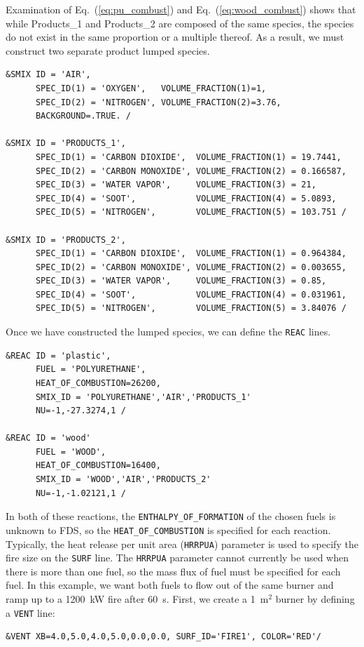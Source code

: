 \documentclass[11pt]{book}
\newcommand{\ct}{\tt\small}
\begin{document}
Examination of Eq.~(\ref{eq:pu_combust}) and Eq.~(\ref{eq:wood_combust}) shows that while Products\_1 and Products\_2 are composed of the same species, the species do not exist in the same proportion or a multiple thereof. As a result, we must construct two separate product lumped species.
\footnotesize \begin{verbatim}
&SMIX ID = 'AIR',
      SPEC_ID(1) = 'OXYGEN',   VOLUME_FRACTION(1)=1,
      SPEC_ID(2) = 'NITROGEN', VOLUME_FRACTION(2)=3.76,
      BACKGROUND=.TRUE. /

&SMIX ID = 'PRODUCTS_1',
      SPEC_ID(1) = 'CARBON DIOXIDE',  VOLUME_FRACTION(1) = 19.7441,
      SPEC_ID(2) = 'CARBON MONOXIDE', VOLUME_FRACTION(2) = 0.166587,
      SPEC_ID(3) = 'WATER VAPOR',     VOLUME_FRACTION(3) = 21,
      SPEC_ID(4) = 'SOOT',            VOLUME_FRACTION(4) = 5.0893,
      SPEC_ID(5) = 'NITROGEN',        VOLUME_FRACTION(5) = 103.751 /

&SMIX ID = 'PRODUCTS_2',
      SPEC_ID(1) = 'CARBON DIOXIDE',  VOLUME_FRACTION(1) = 0.964384,
      SPEC_ID(2) = 'CARBON MONOXIDE', VOLUME_FRACTION(2) = 0.003655,
      SPEC_ID(3) = 'WATER VAPOR',     VOLUME_FRACTION(3) = 0.85,
      SPEC_ID(4) = 'SOOT',            VOLUME_FRACTION(4) = 0.031961,
      SPEC_ID(5) = 'NITROGEN',        VOLUME_FRACTION(5) = 3.84076 /
\end{verbatim} \normalsize
Once we have constructed the lumped species, we can define the {\ct REAC} lines.
\footnotesize \begin{verbatim}
&REAC ID = 'plastic',
      FUEL = 'POLYURETHANE',
      HEAT_OF_COMBUSTION=26200,
      SMIX_ID = 'POLYURETHANE','AIR','PRODUCTS_1'
      NU=-1,-27.3274,1 /

&REAC ID = 'wood'
      FUEL = 'WOOD',
      HEAT_OF_COMBUSTION=16400,
      SMIX_ID = 'WOOD','AIR','PRODUCTS_2'
      NU=-1,-1.02121,1 /
\end{verbatim} \normalsize
In both of these reactions, the {\ct ENTHALPY\_OF\_FORMATION} of the chosen fuels is unknown to FDS, so the {\ct HEAT\_OF\_COMBUSTION} is specified for each reaction. Typically, the heat release per unit area ({\ct HRRPUA}) parameter is used to specify the fire size on the {\ct SURF} line. The {\ct HRRPUA} parameter cannot currently be used when there is more than one fuel, so the mass flux of fuel must be specified for each fuel. In this example, we want both fuels to flow out of the same burner and ramp up to a 1200~kW fire after 60~s. First, we create a 1~m$^2$ burner by defining a {\ct VENT} line:
\footnotesize \begin{verbatim}
&VENT XB=4.0,5.0,4.0,5.0,0.0,0.0, SURF_ID='FIRE1', COLOR='RED'/
\end{verbatim} \normalsize
\end{document}
